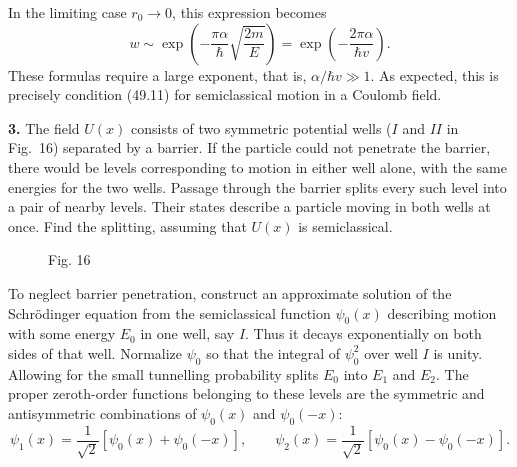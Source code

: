 In the limiting case $r_0\to0$, this expression becomes
\[
 w\sim\exp\left(-\frac{\pi\alpha}{\hbar}\sqrt{\frac{2m}{E}}\right)
 =\exp\left(-\frac{2\pi\alpha}{\hbar v}\right).
\]
These formulas require a large exponent, that is, $\alpha/\hbar v\gg1$.
As expected, this is precisely condition (49.11) for semiclassical motion in a
Coulomb field.

\textbf{3.} The field $U(x)$ consists of two symmetric potential wells ($I$
and $II$ in Fig.~16) separated by a barrier. If the particle could not
penetrate the barrier, there would be levels corresponding to motion in either
well alone, with the same energies for the two wells. Passage through the
barrier splits every such level into a pair of nearby levels. Their states
describe a particle moving in both wells at once. Find the splitting, assuming
that $U(x)$ is semiclassical.

\begin{figure}[ht]
\centering
{}
\par\smallskip Fig. 16
\end{figure}

\SolutionHeading To neglect barrier penetration, construct an approximate
solution of the Schrödinger equation from the semiclassical function
$\psi_0(x)$ describing motion with some energy $E_0$ in one well, say $I$.
Thus it decays exponentially on both sides of that well. Normalize $\psi_0$
so that the integral of $\psi_0^2$ over well $I$ is unity. Allowing for the
small tunnelling probability splits $E_0$ into $E_1$ and $E_2$. The proper
zeroth-order functions belonging to these levels are the symmetric and
antisymmetric combinations of $\psi_0(x)$ and $\psi_0(-x)$:
\begin{equation}
 \psi_1(x)=\frac1{\sqrt2}[\psi_0(x)+\psi_0(-x)],\qquad
 \psi_2(x)=\frac1{\sqrt2}[\psi_0(x)-\psi_0(-x)]. \tag{1}
\end{equation}

